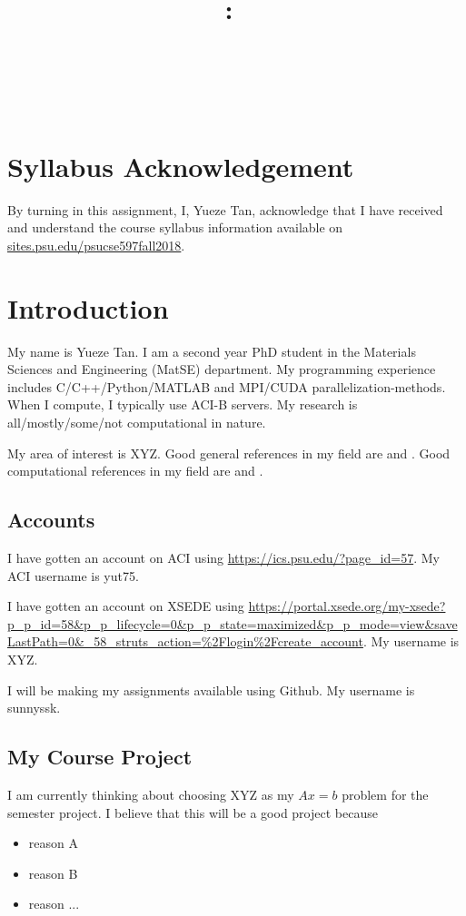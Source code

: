 \documentclass{article}
\title{\vspace{2in}\textmd{\textbf{\hmwkClass:\ \hmwkTitle}}\\\normalsize\vspace{0.1in}\small{\hmwkDueDate}\\\vspace{0.1in}\large{\textit{\hmwkClassInstructor\ \hmwkClassTime}}\vspace{3in}}
\date{}
\author{\textbf{\hmwkAuthorNameb} } %
\begin{document}
\begin{spacing}{1.1}
\maketitle

\newpage
\section{Syllabus Acknowledgement}

By turning in this assignment, I, Yueze Tan, acknowledge that I have received and understand the course syllabus information available on \url{sites.psu.edu/psucse597fall2018}. 

\section{Introduction}

My name is Yueze Tan.  I am a second year PhD student in the Materials Sciences and Engineering (MatSE) department. My programming experience includes C/C++/Python/MATLAB and MPI/CUDA parallelization-methods.  When I compute, I typically use ACI-B servers.  My research is all/mostly/some/not computational in nature. 

My area of interest is XYZ. Good general references in my field are \citet{wilcox2000basic} and \citet{kreyszig2010advanced}.  Good computational references in my field are \citet{anderson1995computational} and \citet{wilcox1998turbulence}. 


\subsection{Accounts}

I have gotten an account on ACI using \url{https://ics.psu.edu/?page_id=57}.  My ACI username is yut75.

I have gotten an account on XSEDE using \url{https://portal.xsede.org/my-xsede?p_p_id=58&p_p_lifecycle=0&p_p_state=maximized&p_p_mode=view&saveLastPath=0&_58_struts_action=%2Flogin%2Fcreate_account}.  My username is XYZ.

I will be making my assignments available using Github. My username is sunnyssk. 

\subsection{My Course Project}

I am currently thinking about choosing XYZ as my $Ax=b$ problem for the semester project. I believe that this will be a good project because
\begin{itemize}
  \item reason A
  \item reason B
  \item reason ...
\end{itemize}



\end{spacing}
\end{document}
